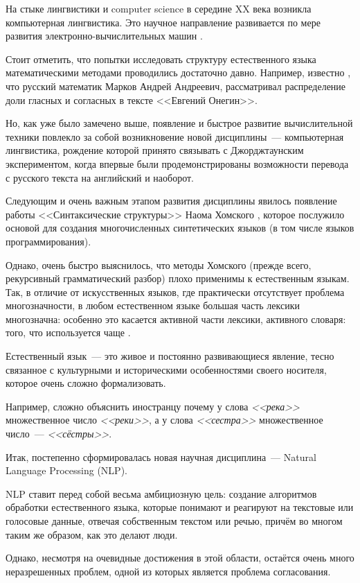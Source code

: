 \documentclass[main]{subfiles}
\begin{document}
На стыке лингвистики и computer science в середине XX века возникла компьютерная лингвистика. Это научное направление развивается по мере развития электронно-вычислительных машин \cite{ches}.

Стоит отметить, что попытки исследовать структуру естественного языка математическими методами проводились достаточно давно. Например, известно \cite{mark}, что русский математик Марков Андрей Андреевич, рассматривал распределение доли гласных и согласных в тексте <<Евгений Онегин>>.

Но, как уже было замечено выше, появление и быстрое развитие вычислительной техники повлекло за собой возникновение новой дисциплины~--- компьютерная лингвистика, рождение которой принято связывать с Джорджтаунским экспериментом, когда впервые были продемонстрированы возможности перевода с русского текста на английский и наоборот.

Следующим и очень важным этапом развития дисциплины явилось появление работы <<Синтаксические структуры>> Наома Хомского \cite{synt}, которое послужило основой для создания многочисленных синтетических языков (в том числе языков программирования).

Однако, очень быстро выяснилось, что методы Хомского (прежде всего, рекурсивный грамматический разбор) плохо применимы к естественным языкам. Так, в отличие от искусственных языков, где практически отсутствует проблема многозначности, в любом естественном языке большая часть лексики многозначна: особенно это касается активной части лексики, активного словаря: того, что используется чаще \cite{zz}.

Естественный язык~--- это живое и постоянно развивающиеся явление, тесно связанное с культурными и историческими особенностями своего носителя, которое очень сложно формализовать.

Например, сложно объяснить иностранцу почему у слова \textit{<<река>>} множественное число\textit{ <<реки>>}, а у слова \textit{<<сестра>>} множественное число~--- \textit{<<сёстры>>}.

Итак, постепенно сформировалась новая научная дисциплина~--- Natural Language Processing (NLP).

NLP ставит перед собой весьма амбициозную цель: создание алгоритмов обработки естественного языка, которые понимают и реагируют на текстовые или голосовые данные, отвечая собственным текстом или речью, причём во многом таким же образом, как это делают люди.

Однако, несмотря на очевидные достижения в этой области, остаётся очень много неразрешенных проблем, одной из которых является проблема согласования.
\end{document}
